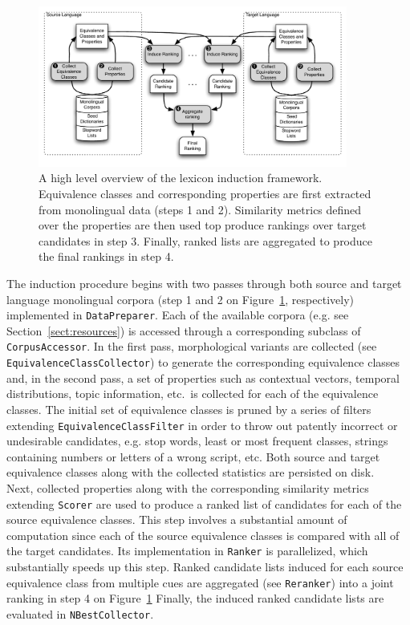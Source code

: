 \documentclass{article}
\newcommand{\secref}[1]{Section~\ref{#1}}
\newcommand{\figref}[1]{Figure~\ref{#1}}
\newcommand{\code}[1]{{\small \tt #1}}
\begin{document}
\begin{figure}[h!]
\centerline{\mbox{\includegraphics[width=4in]{figures/lexinduct}}}
\caption{A high level overview of the lexicon induction framework.  Equivalence classes and corresponding properties are first extracted from monolingual data (steps 1 and 2).  Similarity metrics defined over the properties are then used top produce rankings over target candidates in step 3.  Finally, ranked lists are aggregated to produce the final rankings in step 4.}
\label{fig:system}
\end{figure}

The induction procedure begins with two passes through both source and target language monolingual corpora (step 1 and 2 on \figref{fig:system}, respectively) implemented in \code{DataPreparer}.  Each of the available corpora (e.g. see \secref{sect:resources}) is accessed through a corresponding subclass of \code{CorpusAccessor}.  In the first pass, morphological variants are collected (see \code{EquivalenceClassCollector}) to generate the corresponding equivalence classes and, in the second pass, a set of properties such as contextual vectors, temporal distributions, topic information, etc.\ is collected for each of the equivalence classes. The initial set of equivalence classes is pruned by a series of filters extending \code{EquivalenceClassFilter} in order to throw out patently incorrect or undesirable candidates, e.g. stop words, least or most frequent classes, strings containing numbers or letters of a wrong script, etc. Both source and target equivalence classes along with the collected statistics are persisted on disk.\\

Next, collected properties along with the corresponding similarity metrics extending \code{Scorer} are used to produce a ranked list of candidates for each of the source equivalence classes.  This step involves a substantial amount of computation since each of the source equivalence classes is compared with all of the target candidates. Its implementation in \code{Ranker} is parallelized, which substantially speeds up this step.  Ranked candidate lists induced for each source equivalence class from multiple cues are aggregated (see \code{Reranker}) into a joint ranking in step 4 on \figref{fig:system}  Finally, the induced ranked candidate lists are evaluated in \code{NBestCollector}.\\
\end{document}
